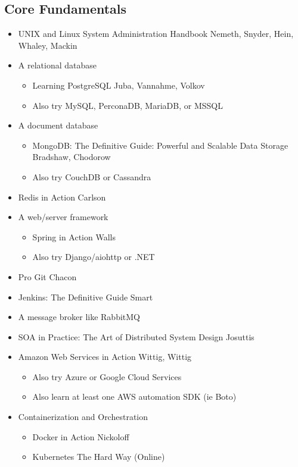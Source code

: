 \documentclass[12pt]{article}
\begin{document}
\subsection{Core Fundamentals}
\begin{itemize}
\item UNIX and Linux System Administration Handbook Nemeth, Snyder, Hein, Whaley, Mackin
\item A relational database
  \begin{itemize}
  \item Learning PostgreSQL Juba, Vannahme, Volkov
  \item Also try MySQL, PerconaDB, MariaDB, or MSSQL
  \end{itemize}
\item A document database
  \begin{itemize}
  \item MongoDB: The Definitive Guide: Powerful and Scalable Data
    Storage Bradshaw, Chodorow
  \item Also try CouchDB or Cassandra
  \end{itemize}
\item Redis in Action Carlson
\item A web/server framework
  \begin{itemize}
  \item Spring in Action Walls
  \item Also try Django/aiohttp or .NET
  \end{itemize}
\item Pro Git Chacon
\item Jenkins: The Definitive Guide Smart
\item A message broker like RabbitMQ
\item SOA in Practice: The Art of Distributed System Design Josuttis
\item Amazon Web Services in Action Wittig, Wittig
  \begin{itemize}
  \item Also try Azure or Google Cloud Services
  \item Also learn at least one AWS automation SDK (ie Boto)
  \end{itemize}
\item Containerization and Orchestration
  \begin{itemize}
  \item Docker in Action Nickoloff
  \item Kubernetes The Hard Way (Online)
  \end{itemize}

\end{itemize}
\end{document}

